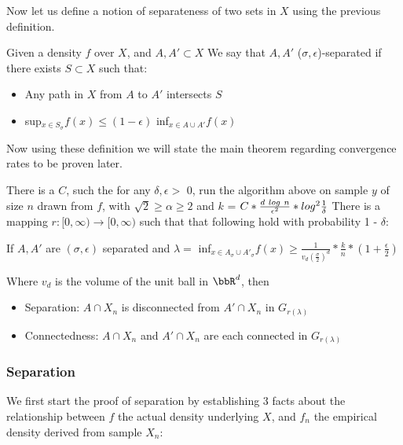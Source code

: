 Now let us define a notion of separateness of two sets in $X$ using the previous definition. 

\vspace{\baselineskip}
\begin{definition}[Separateness]
Given a density $f$ over $X$, and $A, A' \subset X$ We say that $A, A'$ ($\sigma, \epsilon$)-separated if there
exists $S \subset X$ such that:
\begin{itemize}
  \item Any path in $X$ from $A$ to $A'$
intersects $S$
  \item sup$_{x \in S_{\sigma}} f(x) \leq (1 - \epsilon)$ inf$_{x \in A \cup A'}f(x)$
\end{itemize}
\end{definition}

\vspace{\baselineskip}
Now using these definition we will state the main theorem regarding convergence rates to be proven later.

\vspace{\baselineskip}
\begin{theorem}
There is a $C$, such the for any $\delta, \epsilon > $  0, run the algorithm above on sample $y$ of size $n$ drawn from $f$, with $\sqrt{2} \geq \alpha \geq 2$ and $k$ = $C* \frac{d \-\ log \-\ n}{\epsilon^2}* log^2 \frac{1}{\delta}$ There is a mapping $r: [0, \infty) \rightarrow [0, \infty)$ such that that following hold with probability 1 - $\delta$:

If $A, A'$ are $(\sigma, \epsilon)$ separated and $\lambda = $ inf$_{x\in A_{\sigma} \cup A'_{\sigma}}f(x) \geq \frac{1}{v_d(\frac{\sigma}{2})^d} * \frac{k}{n}*(1+\frac{\epsilon}{2})$

Where $v_d$ is the volume of the unit ball in $\bbR^d$, then 
\begin{itemize}
  \item  Separation: $A \cap X_n$ is disconnected from $A' \cap X_n$ in $G_{r(\lambda)}$
  \item Connectedness: $A \cap X_n$ and $A' \cap X_n$ are each connected in $G_{r(\lambda)}$
\end{itemize}
\end{theorem}

\subsubsection{Separation}
We first start the proof of separation by establishing 3 facts about the relationship between $f$ the actual density underlying $X$, and $f_n$ the empirical density derived from sample $X_n$:

